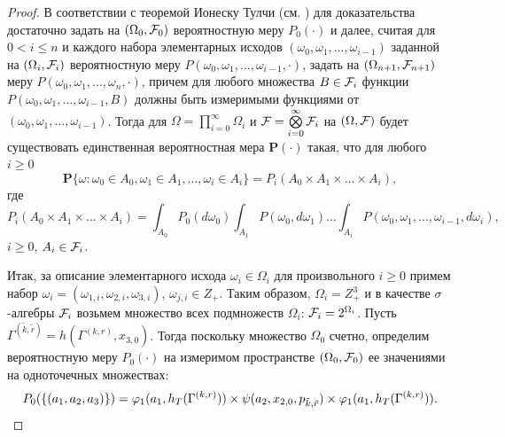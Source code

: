 \documentclass[a4paper,12pt,russian]{extarticle}
\newcommand{\ga}[1]{\Gamma^{\left( #1 \right)} }
\renewcommand{\Pr}{{\mathbf P}}
\begin{document}
\begin{proof}
В соответствии с теоремой Ионеску Тулчи (см. \cite{Shiryaev}) для доказательства достаточно задать на $(\Omega_0, {\cal F}_0)$ вероятностную меру $P_0(\cdot)$ и далее, считая для $0 < i \leqslant n$ и каждого набора элементарных исходов $(\omega_0, \omega_1, \ldots, \omega_{i-1})$ заданной на $(\Omega_i, {\cal F}_i)$ вероятностную меру $P(\omega_0,\omega_1,\ldots, \omega_{i-1},\cdot)$, задать на $(\Omega_{n+1}, {\cal F}_{n+1})$ меру $P(\omega_0,\omega_1,\ldots, \omega_{n},\cdot)$, причем для любого множества $B\in {\cal F}_i$ функции $P(\omega_0,\omega_1,\ldots, \omega_{i-1},B)$
должны быть измеримыми функциями от $(\omega_0, \omega_1, \ldots, \omega_{i-1})$. Тогда для $\Omega=\prod\limits_{i=0}^{\infty}\Omega_i$ и ${\cal F}=\bigotimes\limits_{i=0}^{\infty} {\cal F}_i$ на $(\Omega,{\cal F})$ будет существовать единственная вероятностная мера $\Pr(\cdot)$ такая, что для любого $i \geqslant 0$
\begin{equation}
\Pr\{\omega \colon \omega_0 \in A_0, \omega_1 \in A_1, \ldots, \omega_i\in A_i\} = P_i(A_0 \times A_1 \times \ldots \times A_i),
\label{ProbabilitiesGeneral}
\end{equation}
где 
\begin{equation}
 P_i(A_0 \times A_1 \times \ldots \times A_i) = \int_{A_0} P_0(d \omega_0) \int_{A_1} P(\omega_0,d \omega_1) \ldots \int_{A_i} P(\omega_0, \omega_1, \ldots, \omega_{i-1}, d \omega_i),
\label{ProbabilitiesGeneralOne}
\end{equation}
$i\geqslant 0$, $A_i\in {\cal F}_i$. 

Итак, за описание элементарного исхода $\omega_i \in \Omega_i$ для произвольного $i \geqslant 0$ примем набор $\omega_i=(\omega_{1,i},\omega_{2,i},\omega_{3,i})$, $\omega_{j,i}\in Z_+$. Таким образом, $\Omega_i=Z_+^3$ и в качестве $\sigma$-алгебры ${\cal F}_i$ возьмем множество всех подмножеств $\Omega_i$: ${\cal F}_i=2^{\Omega_i}$. Пусть $\ga{\widetilde{k},\widetilde{r}}=h(\ga{k,r},x_{3,0})$. Тогда  поскольку множество $\Omega_0$ счетно, определим вероятностную меру $P_0(\cdot)$ на измеримом пространстве $(\Omega_0,{\cal F}_0)$ ее значениями на одноточечных множествах:
\begin{equation}
P_0(\{(a_1,a_2,a_3)\})=\vp_1(a_1,h_T(\ga{k,r})) \times \psi(a_2,x_{2,0}, p_{\tilde{k},\tilde{r}}) \times \vp_1(a_1,h_T(\ga{k,r})).
\label{probabilitiesOne}
\end{equation}


\end{proof}
\end{document}
